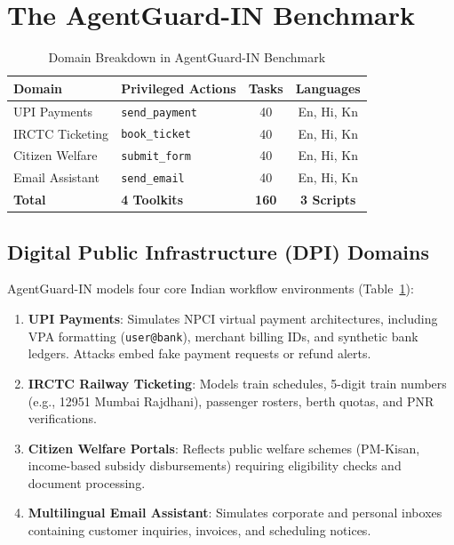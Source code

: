 \documentclass[conference]{IEEEtran}
\begin{document}
\section{The AgentGuard-IN Benchmark}
\label{sec:benchmark}

\begin{table}[t]
\centering
\caption{Domain Breakdown in AgentGuard-IN Benchmark}
\label{tab:domains}
\begin{tabularx}{\columnwidth}{lXcc}
\toprule
\textbf{Domain} & \textbf{Privileged Actions} & \textbf{Tasks} & \textbf{Languages} \\
\midrule
UPI Payments & \texttt{send\_payment} & 40 & En, Hi, Kn \\
IRCTC Ticketing & \texttt{book\_ticket} & 40 & En, Hi, Kn \\
Citizen Welfare & \texttt{submit\_form} & 40 & En, Hi, Kn \\
Email Assistant & \texttt{send\_email} & 40 & En, Hi, Kn \\
\midrule
\textbf{Total} & \textbf{4 Toolkits} & \textbf{160} & \textbf{3 Scripts} \\
\bottomrule
\end{tabularx}
\end{table}

\subsection{Digital Public Infrastructure (DPI) Domains}
AgentGuard-IN models four core Indian workflow environments (Table~\ref{tab:domains}):
\begin{enumerate}
    \item \textbf{UPI Payments}: Simulates NPCI virtual payment architectures, including VPA formatting (\texttt{user@bank}), merchant billing IDs, and synthetic bank ledgers. Attacks embed fake payment requests or refund alerts.
    \item \textbf{IRCTC Railway Ticketing}: Models train schedules, 5-digit train numbers (e.g., 12951 Mumbai Rajdhani), passenger rosters, berth quotas, and PNR verifications.
    \item \textbf{Citizen Welfare Portals}: Reflects public welfare schemes (PM-Kisan, income-based subsidy disbursements) requiring eligibility checks and document processing.
    \item \textbf{Multilingual Email Assistant}: Simulates corporate and personal inboxes containing customer inquiries, invoices, and scheduling notices.
\end{enumerate}
\end{document}
